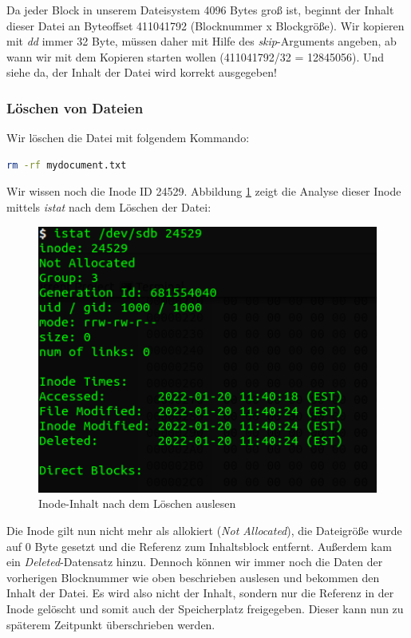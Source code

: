 Da jeder Block in unserem Dateisystem 4096 Bytes groß ist, beginnt der Inhalt dieser Datei an Byteoffset 411041792 (Blocknummer x Blockgröße). Wir kopieren mit \textit{dd} immer 32 Byte, müssen daher mit Hilfe des \textit{skip}-Arguments angeben, ab wann wir mit dem Kopieren starten wollen (411041792/32 = 12845056). Und siehe da, der Inhalt der Datei wird korrekt ausgegeben!

\subsubsection{Löschen von Dateien}

Wir löschen die Datei mit folgendem Kommando:

\begin{lstlisting}[language=bash]
rm -rf mydocument.txt
\end{lstlisting} 

Wir wissen noch die Inode ID 24529. Abbildung \ref{fig:istatafterdelete} zeigt die Analyse dieser Inode mittels \textit{istat} nach dem Löschen der Datei:

\begin{figure}[H]
	\centering
	\includegraphics[width=12cm,keepaspectratio=true]{pictures/istatafterdelete.png}
	\caption{
		Inode-Inhalt nach dem Löschen auslesen
	}
	\label{fig:istatafterdelete}
\end{figure}

Die Inode gilt nun nicht mehr als allokiert (\textit{Not Allocated}), die Dateigröße wurde auf 0 Byte gesetzt und die Referenz zum Inhaltsblock entfernt. Außerdem kam ein \textit{Deleted}-Datensatz hinzu. Dennoch können wir immer noch die Daten der vorherigen Blocknummer wie oben beschrieben auslesen und bekommen den Inhalt der Datei. Es wird also nicht der Inhalt, sondern nur die Referenz in der Inode gelöscht und somit auch der Speicherplatz freigegeben. Dieser kann nun zu späterem Zeitpunkt überschrieben werden.

